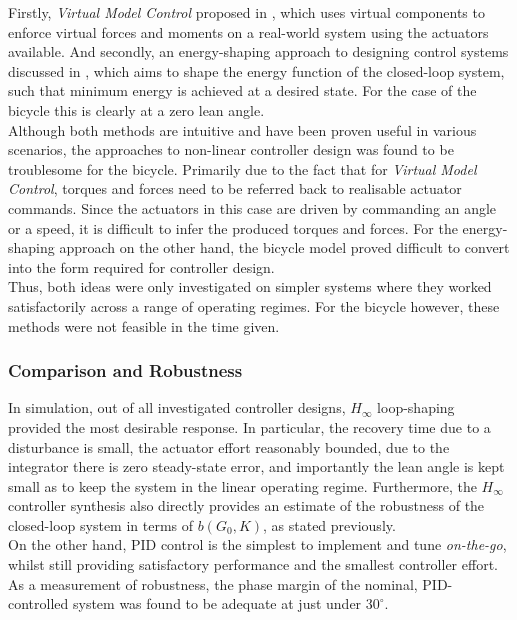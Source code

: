 Firstly, \textit{Virtual Model Control} proposed in \cite{virtualmodel}, which uses virtual components to enforce virtual forces and moments on a real-world system using the actuators available. And secondly, an energy-shaping approach to designing control systems discussed in \cite{puttingenergy}, which aims to shape the energy function of the closed-loop system, such that minimum energy is achieved at a desired state. For the case of the bicycle this is clearly at a zero lean angle. \\

Although both methods are intuitive and have been proven useful in various scenarios, the approaches to non-linear controller design was found to be troublesome for the bicycle. Primarily due to the fact that for \textit{Virtual Model Control}, torques and forces need to be referred back to realisable actuator commands. Since the actuators in this case are driven by commanding an angle or a speed, it is difficult to infer the produced torques and forces. For the energy-shaping approach on the other hand, the bicycle model proved difficult to convert into the form required for controller design.\\

Thus, both ideas were only investigated on simpler systems where they worked satisfactorily across a range of operating regimes. For the bicycle however, these methods were not feasible in the time given.

\subsubsection{Comparison and Robustness}
In simulation, out of all investigated controller designs, $H_{\infty}$ loop-shaping provided the most desirable response. In particular, the recovery time due to a disturbance is small, the actuator effort reasonably bounded, due to the integrator there is zero steady-state error, and importantly the lean angle is kept small as to keep the system in the linear operating regime. Furthermore, the $H_{\infty}$ controller synthesis also directly provides an estimate of the robustness of the closed-loop system in terms of $b(G_0,K)$, as stated previously. \\

On the other hand, PID control is the simplest to implement and tune \textit{on-the-go}, whilst still providing satisfactory performance and the smallest controller effort. As a measurement of robustness, the phase margin of the nominal, PID-controlled system was found to be adequate at just under $30^{\circ}$. \\


